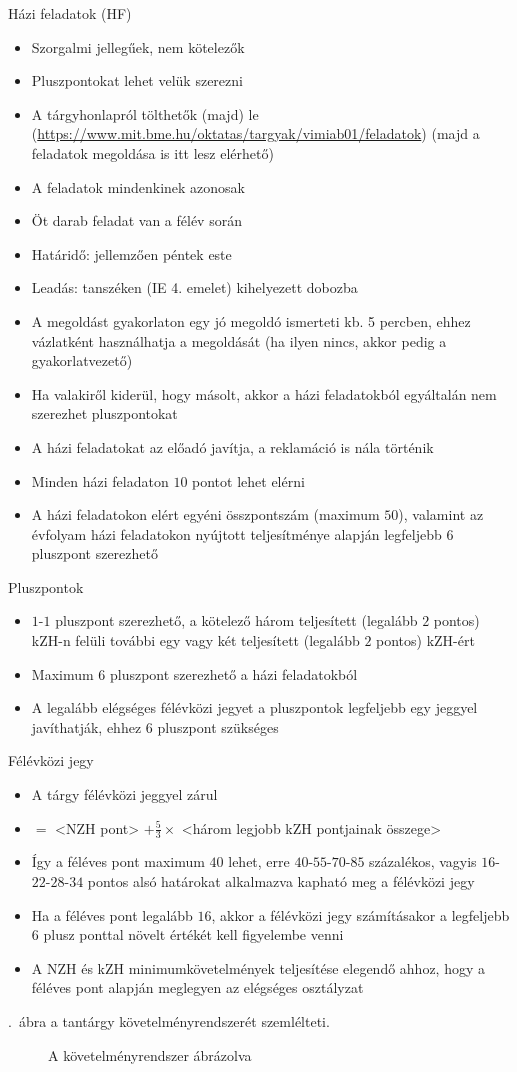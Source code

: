 \documentclass[a4paper,12pt]{article}
\begin{document}
	Házi feladatok (HF)
	\begin{itemize}
		\item Szorgalmi jellegűek, nem kötelezők
		\item Pluszpontokat lehet velük szerezni
		\item A tárgyhonlapról tölthetők (majd) le (\url{https://www.mit.bme.hu/oktatas/targyak/vimiab01/feladatok}) (majd a feladatok megoldása is itt lesz elérhető)
		\item A feladatok mindenkinek azonosak
		\item Öt darab feladat van a félév során
		\item Határidő: jellemzően péntek este
		\item Leadás: tanszéken (IE 4. emelet) kihelyezett dobozba
		\item A megoldást gyakorlaton egy jó megoldó ismerteti kb. 5 percben, ehhez vázlatként használhatja a megoldását (ha ilyen nincs, akkor pedig a gyakorlatvezető)
		\item Ha valakiről kiderül, hogy másolt, akkor a házi feladatokból egyáltalán nem szerezhet pluszpontokat
		\item A házi feladatokat az előadó javítja, a reklamáció is nála történik
		\item Minden házi feladaton $10$ pontot lehet elérni
		\item A házi feladatokon elért egyéni összpontszám (maximum $50$), valamint az évfolyam házi feladatokon nyújtott teljesítménye alapján legfeljebb $6$ pluszpont szerezhető
	\end{itemize}
	Pluszpontok
	\begin{itemize}
		\item $1$-$1$ pluszpont szerezhető, a kötelező három teljesített (legalább $2$ pontos) kZH-n felüli további egy vagy két teljesített (legalább $2$ pontos) kZH-ért
		\item Maximum $6$ pluszpont szerezhető a házi feladatokból
		\item A legalább elégséges félévközi jegyet a pluszpontok legfeljebb egy jeggyel javíthatják, ehhez $6$ pluszpont szükséges
	\end{itemize}
	Félévközi jegy
	\begin{itemize}
		\item A tárgy félévközi jeggyel zárul
		\item <Féléves pont> $=$ <NZH pont> $+\frac{5}{3}\times$ <három legjobb kZH pontjainak összege>
		\item Így a féléves pont maximum $40$ lehet, erre $40$-$55$-$70$-$85$ százalékos, vagyis $16$-$22$-$28$-$34$ pontos alsó határokat alkalmazva kapható meg a félévközi jegy
		\item Ha a féléves pont legalább $16$, akkor a félévközi jegy számításakor a legfeljebb $6$ plusz ponttal növelt értékét kell figyelembe venni
		\item A NZH és kZH minimumkövetelmények teljesítése elegendő ahhoz, hogy a féléves pont alapján meglegyen az elégséges osztályzat
	\end{itemize}
	\Az{\ref{fig:pontrendszer}}.~ábra a tantárgy követelményrendszerét szemlélteti.
	\begin{landscape}
		\begin{figure}[h]
			
			\caption{A követelményrendszer ábrázolva}
			\label{fig:pontrendszer}
		\end{figure}
	\end{landscape}
\end{document}
